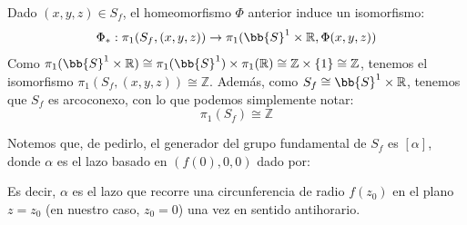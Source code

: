 \begin{ejercicio}
\begin{enumerate}[label=\alph*)]
            Dado $(x,y,z)\in S_f$, el homeomorfismo $\Phi$ anterior induce un isomorfismo:
            \begin{equation*}
                \Phi_\ast:\pi_1(S_f,(x,y,z)) \to \pi_1(\bb{S}^1\times \mathbb{R},\Phi(x,y,z))
            \end{equation*}
            Como $\pi_1(\bb{S}^1\times \mathbb{R})\cong \pi_1(\bb{S}^1) \times \pi_1(\mathbb{R}) \cong \mathbb{Z} \times \{1\} \cong \mathbb{Z}$, tenemos el isomorfismo $\pi_1(S_f,(x,y,z))\cong \mathbb{Z}$. Además, como $S_f\cong \bb{S}^1\times \mathbb{R}$, tenemos que $S_f$ es arcoconexo, con lo que podemos simplemente notar:
            \begin{equation*}
                \pi_1(S_f)\cong \mathbb{Z}
            \end{equation*}

            Notemos que, de pedirlo, el generador del grupo fundamental de $S_f$ es $[\alpha]$, donde $\alpha$ es el lazo basado en $(f(0),0,0)$ dado por:

            Es decir, $\alpha$ es el lazo que recorre una circunferencia de radio $f(z_0)$ en el plano $z=z_0$ (en nuestro caso, $z_0=0$) una vez en sentido antihorario.
    \end{enumerate}
\end{ejercicio}

